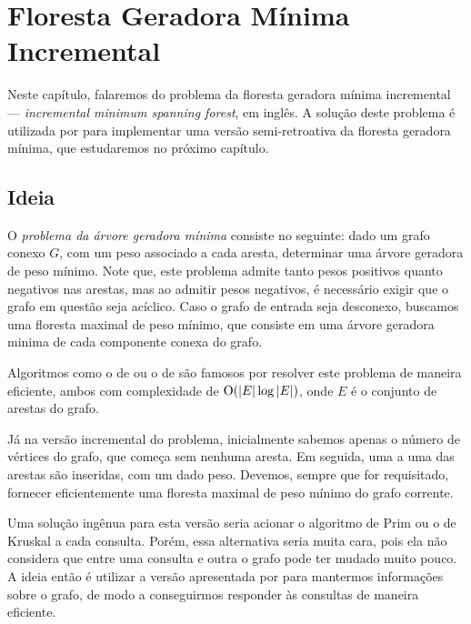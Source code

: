 
\chapter{Floresta Geradora Mínima Incremental}
\label{cap:incremental-msf}

Neste capítulo, falaremos do problema da floresta geradora mínima incremental --- \emph{incremental minimum spanning forest}, em inglês. A solução deste problema é utilizada por \citet{10.1093/comjnl/bxaa135} para implementar uma versão semi-retroativa da floresta geradora mínima, que estudaremos no próximo capítulo.

\section{Ideia}
\label{sec:imsf-ideia}

O \emph{problema da árvore geradora mínima} consiste no seguinte: dado um grafo conexo $G$, com um peso associado a cada aresta, determinar uma árvore geradora de peso mínimo. Note que, este problema admite tanto pesos positivos quanto negativos nas arestas, mas ao admitir pesos negativos, é necessário exigir que o grafo em questão seja acíclico. Caso o grafo de entrada seja desconexo, buscamos uma floresta maximal de peso mínimo, que consiste em uma árvore geradora minima de cada componente conexa do grafo.

Algoritmos como o de \citet{6773228} ou o de \citet{kruskal1956shortest} são famosos por resolver este problema de maneira eficiente, ambos com complexidade de $\mathrm{O}(|E| \log |E|)$, onde $E$ é o conjunto de arestas do grafo.

Já na versão incremental do problema, inicialmente sabemos apenas o número de vértices do grafo, que começa sem nenhuma aresta. Em seguida, uma a uma das arestas são inseridas, com um dado peso. Devemos, sempre que for requisitado, fornecer eficientemente uma floresta maximal de peso mínimo do grafo corrente.

Uma solução ingênua para esta versão seria acionar o algoritmo de Prim ou o de Kruskal a cada consulta. Porém, essa alternativa seria muita cara, pois ela não considera que entre uma consulta e outra o grafo pode ter mudado muito pouco. A ideia então é utilizar a versão apresentada por \citet{frederickson1985data} para mantermos informações sobre o grafo, de modo a conseguirmos responder às consultas de maneira eficiente.

